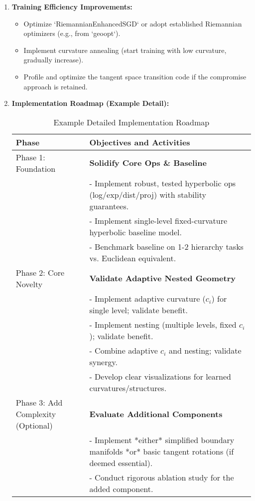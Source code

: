 \documentclass[11pt]{article}
\begin{document}
\begin{enumerate}[noitemsep]
    \item \textbf{Training Efficiency Improvements:}
    \begin{itemize}[noitemsep]
        \item Optimize `RiemannianEnhancedSGD` or adopt established Riemannian optimizers (e.g., from `geoopt`).
        \item Implement curvature annealing (start training with low curvature, gradually increase).
        \item Profile and optimize the tangent space transition code if the compromise approach is retained.
    \end{itemize}

    \item \textbf{Implementation Roadmap (Example Detail):}

\begin{table}[H]
\centering
\caption{Example Detailed Implementation Roadmap}
\label{tab:roadmap_appendix} %
\begin{tabular}{@{}p{2.5cm}p{12.5cm}@{}}
\toprule
\textbf{Phase} & \textbf{Objectives and Activities} \\ \midrule
Phase 1: Foundation & \textbf{Solidify Core Ops \& Baseline} \\
        & - Implement robust, tested hyperbolic ops (log/exp/dist/proj) with stability guarantees. \\
        & - Implement single-level fixed-curvature hyperbolic baseline model. \\
        & - Benchmark baseline on 1-2 hierarchy tasks vs. Euclidean equivalent. \\ \midrule
Phase 2: Core Novelty & \textbf{Validate Adaptive Nested Geometry} \\
        & - Implement adaptive curvature ($c_i$) for single level; validate benefit. \\
        & - Implement nesting (multiple levels, fixed $c_i$); validate benefit. \\
        & - Combine adaptive $c_i$ and nesting; validate synergy. \\
        & - Develop clear visualizations for learned curvatures/structures. \\ \midrule
Phase 3: Add Complexity (Optional) & \textbf{Evaluate Additional Components} \\
        & - Implement *either* simplified boundary manifolds *or* basic tangent rotations (if deemed essential). \\
        & - Conduct rigorous ablation study for the added component. \\

\end{tabular}
\end{table}
\end{enumerate}
\end{document}
